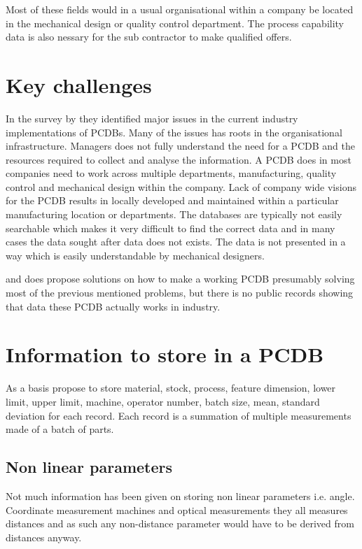 \documentclass[aip,amsmath,reprint, author-year]{revtex4-1}
\begin{document}
Most of these fields would in a usual organisational within a company be located in the mechanical design or quality control department. 
The process capability data is also nessary for the sub contractor to make qualified offers.


\section{Key challenges}
In the survey by \cite{tata1999process} they identified major issues in the current industry implementations of PCDBs. 
Many of the issues has roots in the organisational infrastructure. 
Managers does not fully understand the need for a PCDB and the resources required to collect and analyse the information.
A PCDB does in most companies need to work across multiple departments, manufacturing, quality control and mechanical design within the company.
Lack of company wide visions for the PCDB results in locally developed and maintained within a particular manufacturing location or departments.
The databases are typically not easily searchable which makes it very difficult to find the correct data and in many cases the data sought after data does not exists. 
The data is not presented in a way which is easily understandable by mechanical designers.

\cite{thornton2000use} and \cite{thornton2004variation} does propose solutions on how to make a working PCDB presumably solving most of the previous mentioned problems, but there is no public records showing that data these PCDB actually works in industry.  

\section{Information to store in a PCDB}

As a basis \cite{thornton2004build} propose to store material, stock, process, feature dimension, lower limit, upper limit, machine, operator number, batch size, mean, standard deviation for each record. Each record is a summation of multiple measurements made of a batch of parts.

\subsection{Non linear parameters}
Not much information has been given on storing non linear parameters i.e. angle. Coordinate measurement machines and optical measurements they all measures distances and as such any non-distance parameter would have to be derived from distances anyway.
\end{document}
